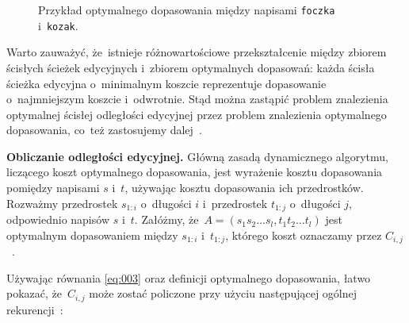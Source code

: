 \documentclass{praca1}
\begin{document}
\begin{figure}[width=80pt]
\centering
{}
\cprotect\caption{Przykład optymalnego dopasowania między napisami \verb|foczka| i~\verb|kozak|.}\label{rys:001}
\end{figure}

Warto zauważyć, że~istnieje różnowartościowe przekształcenie między zbiorem ścisłych ścieżek edycyjnych i~zbiorem optymalnych dopasowań: każda ścisła ścieżka edycyjna o~minimalnym koszcie reprezentuje dopasowanie o~najmniejszym koszcie i~odwrotnie. Stąd można zastąpić problem znalezienia optymalnej ścisłej odległości edycyjnej przez problem znalezienia optymalnego dopasowania, co~też zastosujemy dalej~\cite{Boytsov2011:indexingmethods}.

\textbf{Obliczanie odległości edycyjnej.} Główną zasadą dynamicznego algorytmu, liczącego koszt optymalnego dopasowania, jest wyrażenie kosztu dopasowania pomiędzy napisami $s$ i~$t$, używając kosztu dopasowania ich przedrostków. Rozważmy przedrostek $s_{1:i}$ o~długości $i$ i~przedrostek $t_{1:j}$ o~długości $j$, odpowiednio napisów $s$ i~$t$. Załóżmy, że~$A = (s_1 s_2\ldots s_l, t_1 t_2 \ldots t_l)$ jest optymalnym dopasowaniem między $s_{1:i}$ i~$t_{1:j}$, którego koszt oznaczamy przez $C_{i,j}$~\cite{Boytsov2011:indexingmethods}.

Używając równania \eqref{eq:003} oraz definicji optymalnego dopasowania, łatwo pokazać, że~$C_{i,j}$ może zostać policzone przy użyciu następującej ogólnej rekurencji~\cite{Ukkonen1985:algorithmsforapprox}:
\end{document}
